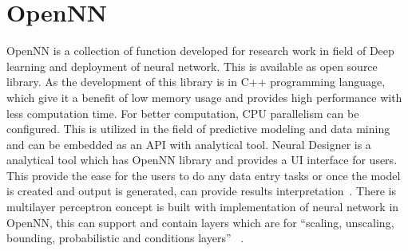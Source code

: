\section{OpenNN}

OpenNN is a collection of function developed for research work in field of 
Deep learning and deployment of neural network. This is available as open 
source library. As the development of this library is in C++ programming 
language, which give it a benefit of low memory usage and provides high 
performance with less computation time. For better computation, CPU 
parallelism can be configured. This is utilized in the field of predictive 
modeling and data mining and can be embedded as an API with analytical tool.
 Neural Designer is a analytical tool which has OpenNN library and provides a 
UI interface for users. This provide the ease for the users to do any data 
entry tasks or once the model is created and output is generated, can provide 
results interpretation~\cite{hid-sp18-520-OpenNN}.
There is multilayer perceptron concept is built with implementation of 
neural network in OpenNN, this can support and contain layers which 
are for ``scaling, unscaling, bounding, probabilistic and conditions layers''
~\cite{hid-sp18-520-OpenNNn}. 

